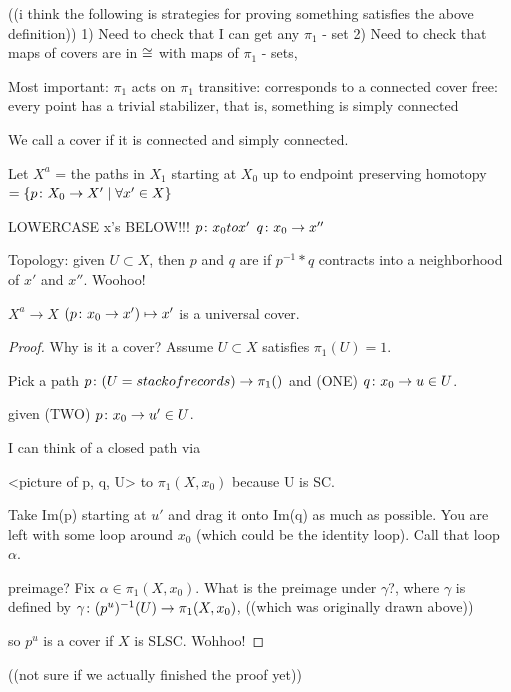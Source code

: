 \documentclass[11pt,leqno,oneside]{amsart}
\numberwithin{thm}{section}
\newcommand{\fund}[1][1]{\pi_{#1}}
\begin{document}
((i think the following is strategies for proving something satisfies the above definition))
1) Need to check that I can get any $\fund$ - set
2) Need to check that maps of covers are in $\mathrel{\cong}$ with maps of $\fund$ - sets,



Most important:
$\fund$ acts on $\fund$
transitive: corresponds to a connected cover
free: every point has a trivial stabilizer, that is, something is simply connected

\begin{defn}
  We call a cover  if it is connected and simply connected.
\end{defn}

Let $X^a$ = {the paths in $X_1$ starting at $X_0$ up to endpoint preserving homotopy }
$= \{ p \colon X_0 \to X' \mid \forall x' \in X \}$

LOWERCASE x's BELOW!!!
$p \colon x_0 to x'$
$q \colon x_0 \to x''$

\begin{defn}
  Topology: given $U \subset X$, then $p$ and $q$ are  if $p^{-1}*q$ contracts into a neighborhood of $x'$ and $x''$.  Woohoo!
\end{defn}

\begin{thm}
  $X^a \to X$
  $(p \colon x_0 \to x') \mapsto x'$
  is a universal cover.
\end{thm}
\begin{proof}
  Why is it a cover?  Assume $U \subset X$ satisfies $\fund(U) = 1$.

  Pick a path $p \from (U = stack of records) \to \fund()$ and (ONE) $q \colon x_0 \to u \in U$.

  given (TWO) $p \colon x_0 \to u' \in U$.

  I can think of a closed path via

  <picture of p, q, U> to $\fund(X, x_0)$
  because U is SC.

  Take Im(p) starting at $u'$ and drag it onto Im(q) as much as possible.  You are left with some loop around $x_0$ (which could be the identity loop).  Call that loop $\alpha$.

  preimage?  Fix $\alpha \in \fund(X, x_0)$.  What is the preimage under $\gamma$?, where $\gamma$ is defined by $\gamma \from (p^u)^{-1}(U) \to \fund(X, x_0)$, ((which was originally drawn above))

  so $p^u$ is a cover if $X$ is SLSC.  Wohhoo!
\end{proof}
((not sure if we actually finished the proof yet))
\end{document}
